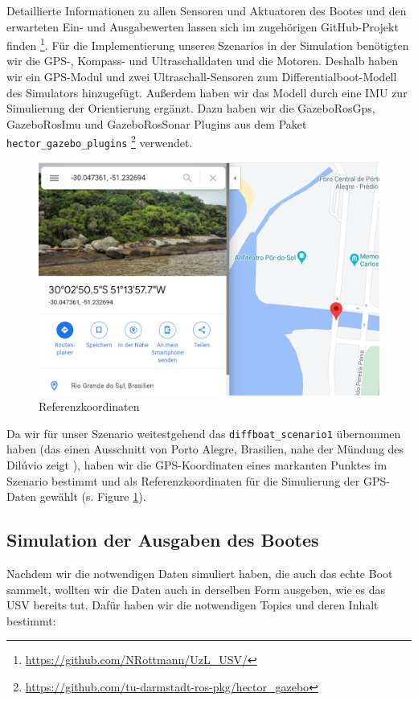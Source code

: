 \documentclass[conference]{IEEEtran}
\begin{document}
Detaillierte Informationen zu allen Sensoren und Aktuatoren des Bootes und den erwarteten Ein- und Ausgabewerten lassen sich im zugehörigen GitHub-Projekt finden \footnote{\url{https://github.com/NRottmann/UzL_USV/}}.
Für die Implementierung unseres Szenarios in der Simulation benötigten wir die GPS-, Kompass- und Ultraschalldaten und die Motoren. Deshalb haben wir ein GPS-Modul und zwei Ultraschall-Sensoren zum Differentialboot-Modell des Simulators hinzugefügt. Außerdem haben wir das Modell durch eine IMU zur Simulierung der Orientierung ergänzt. Dazu haben wir die GazeboRosGps, GazeboRosImu und GazeboRosSonar Plugins aus dem Paket \texttt{hector\_gazebo\_plugins}  \footnote{\url{https://github.com/tu-darmstadt-ros-pkg/hector_gazebo}} verwendet.

\begin{figure}
	\includegraphics[width=\linewidth]{reference.png}
	\caption{Referenzkoordinaten}
	\label{reference}
\end{figure}

Da wir für unser Szenario weitestgehend das \texttt{diffboat\_scenario1} übernommen haben (das einen Ausschnitt von Porto Alegre, Brasilien, nahe der Mündung des Dilúvio zeigt \cite{paravisi2019}), haben wir die GPS-Koordinaten eines markanten Punktes im Szenario bestimmt und als Referenzkoordinaten für die Simulierung der GPS-Daten gewählt (s. Figure \ref{reference}).

\subsection{Simulation der Ausgaben des Bootes}

Nachdem wir die notwendigen Daten simuliert haben, die auch das echte Boot sammelt, wollten wir die Daten auch in derselben Form ausgeben, wie es das USV bereits tut. Dafür haben wir die notwendigen Topics und deren Inhalt bestimmt:
\end{document}
